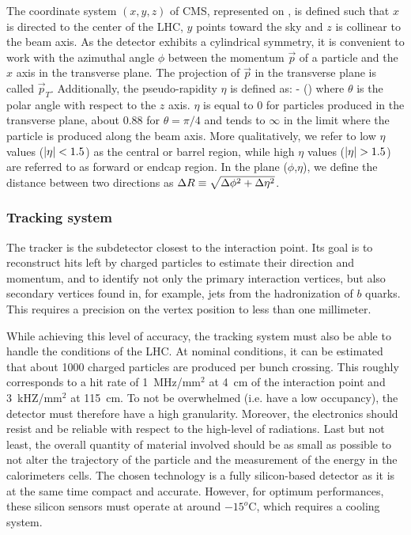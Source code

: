     The coordinate system $(x,y,z)$ of CMS, represented on
    , is defined such that $x$ is directed to
    the center of the LHC, $y$ points toward the sky and $z$ is collinear to the
    beam axis. As the detector exhibits a cylindrical symmetry, it is convenient
    to work with the azimuthal angle $\phi$ between the momentum $\vec{p}$ of a
    particle and the $x$ axis in the transverse plane. The projection of
    $\vec{p}$ in the transverse plane is called $\vec{p}_T$.  Additionally, the
    pseudo-rapidity $\eta$ is defined as:
    {
        \eta {} - ()
    }
    where $\theta$ is the polar angle with respect to the $z$ axis. $\eta$ is
    equal to 0 for particles produced in the transverse plane, about 0.88 for
    $\theta = \pi/4$ and tends to $\infty$ in the limit where the particle is
    produced along the beam axis. More qualitatively, we refer to low $\eta$
    values ($\left| \eta \right| < 1.5$) as the central or barrel region, while high $\eta$
    values ($\left| \eta \right| > 1.5$) are referred to as forward or endcap region.  In
    the plane ($\phi$,$\eta$), we define the distance between two directions as
    $\Delta R \equiv \sqrt{\Delta\phi^2 + \Delta \eta^2}$.


        \subsubsection{Tracking system}

    The tracker is the subdetector closest to the interaction point. Its goal is
    to reconstruct hits left by charged particles to estimate their direction
    and momentum, and to identify not only the primary interaction vertices, but
    also secondary vertices found in, for example, jets from the hadronization
    of $b$ quarks.  This requires a precision on the vertex position to less
    than one millimeter.

    While achieving this level of accuracy, the tracking system must also be
    able to handle the conditions of the LHC. At nominal conditions, it can be
    estimated that about 1000 charged particles are produced per bunch crossing.
    This roughly corresponds to a hit rate of 1~MHz/mm$^2$ at 4~cm of the
    interaction point and 3~kHZ/mm$^2$ at 115~cm.  To not be overwhelmed (i.e.
    have a low occupancy), the detector must therefore have a high granularity.
    Moreover, the electronics should resist and be reliable with respect to the
    high-level of radiations. Last but not least, the overall quantity of
    material involved should be as small as possible to not alter the trajectory
    of the particle and the measurement of the energy in the calorimeters cells.
    The chosen technology is a fully silicon-based detector as it is at the same
    time compact and accurate. However, for optimum performances, these silicon
    sensors must operate at around $-15^o$C, which requires a cooling system.

